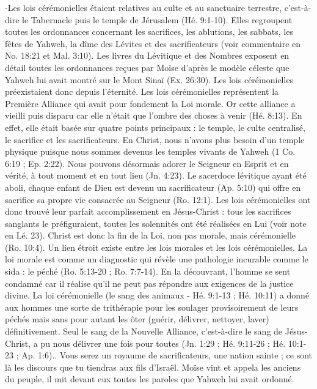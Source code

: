 \begin{multicols}{2}
{-Les lois cérémonielles étaient relatives au culte  et au sanctuaire terrestre, c’est-à-dire le Tabernacle puis le temple de Jérusalem (Hé. 9:1-10). Elles regroupent toutes les ordonnances concernant les sacrifices, les ablutions, les sabbats, les fêtes de Yahweh, la dîme des Lévites et des sacrificateurs (voir commentaire en No. 18:21 et Mal. 3:10). Les livres du Lévitique et des Nombres exposent en détail toutes les ordonnances reçues par Moïse d’après le modèle céleste que Yahweh lui avait montré  sur le Mont Sinaï (Ex. 26:30). Les lois cérémonielles préexistaient donc depuis l’éternité.
Les lois cérémonielles représentent la Première Alliance qui avait pour fondement la Loi morale. Or cette alliance a vieilli puis disparu car elle n’était que l’ombre des choses à venir (Hé. 8:13). En effet, elle était basée sur quatre points principaux : le temple, le culte centralisé, le sacrifice et les sacrificateurs. En Christ, nous n’avons plus besoin d’un temple physique puisque nous sommes devenus les temples vivants  de Yahweh (1 Co. 6:19 ; Ep. 2:22). Nous pouvons désormais adorer le Seigneur en Esprit et en vérité, à tout moment et en tout lieu (Jn. 4:23). Le sacerdoce lévitique ayant été aboli, chaque enfant de Dieu est devenu un sacrificateur (Ap. 5:10) qui offre en sacrifice sa propre vie consacrée au Seigneur (Ro. 12:1).
Les lois cérémonielles ont donc trouvé leur parfait accomplissement en Jésus-Christ : tous les sacrifices sanglants le préfiguraient, toutes les solennités ont été réalisées en Lui (voir note en Lé. 23). Christ est donc la fin de la Loi, non pas morale, mais cérémonielle (Ro. 10:4).
Un lien étroit existe entre les lois morales et les lois cérémonielles. La loi morale est comme un diagnostic qui révèle une pathologie incurable comme le sida : le péché (Ro. 5:13-20 ; Ro. 7:7-14). En la découvrant, l’homme se sent condamné car il réalise qu’il ne peut pas répondre aux exigences de la justice divine. La loi cérémonielle (le sang des animaux - Hé. 9:1-13 ; Hé. 10:11) a donné aux hommes une sorte de trithérapie pour les soulager provisoirement de leurs péchés mais sans pour autant les ôter (guérir, délivrer, nettoyer, laver) définitivement. Seul le sang de la Nouvelle Alliance, c’est-à-dire le sang de Jésus-Christ, a pu nous délivrer une fois pour toutes (Jn. 1:29 ; Hé. 9:11-26 ; Hé. 10:1-23 ; Ap. 1:6).}.
Vous serez un royaume de sacrificateurs, une nation sainte ; ce sont là les discours que tu tiendras aux fils d'Israël.
Moïse vint et appela les anciens du peuple, il mit devant eux toutes les paroles que Yahweh lui avait ordonné.

\end{multicols}

